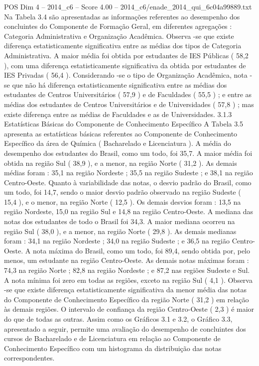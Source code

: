 \begin{textsample}{POS Dim 4 – 2014\_c6 – Score 4.00 – 2014\_c6/enade\_2014\_qui\_6c04a99889.txt}
Na Tabela 3.4 são apresentadas as informações referentes ao desempenho dos concluintes do Componente de Formação Geral, em diferentes agregações : Categoria Administrativa e Organização Acadêmica.
Observa -se que existe diferença estatisticamente significativa entre as médias dos tipos de Categoria Administrativa.
A maior média foi obtida por estudantes de IES Públicas ( 58,2 ), com uma diferença estatisticamente significativa da obtida por estudantes de IES Privadas ( 56,4 ).
Considerando -se o tipo de Organização Acadêmica, nota -se que não há diferença estatisticamente significativa entre as médias dos estudantes de Centros Universitários ( 57,9 ) e de Faculdades ( 55,5 ) ; e entre as médias dos estudantes de Centros Universitários e de Universidades ( 57,8 ) ; mas existe diferença entre as médias de Faculdades e as de Universidades. 3.1.3 Estatísticas Básicas do Componente de Conhecimento Específico A Tabela 3.5 apresenta as estatísticas básicas referentes ao Componente de Conhecimento Específico da área de Química ( Bacharelado e Licenciatura ).
A média do desempenho dos estudantes do Brasil, como um todo, foi 35,7.
A maior média foi obtida na região Sul ( 38,9 ), e a menor, na região Norte ( 31,2 ).
As demais médias foram : 35,1 na região Nordeste ; 35,5 na região Sudeste ; e 38,1 na região Centro-Oeste.
Quanto à variabilidade das notas, o desvio padrão do Brasil, como um todo, foi 14,7, sendo o maior desvio padrão observado na região Sudeste ( 15,4 ), e o menor, na região Norte ( 12,5 ).
Os demais desvios foram : 13,5 na região Nordeste, 15,0 na região Sul e 14,8 na região Centro-Oeste.
A mediana das notas dos estudantes de todo o Brasil foi 34,3.
A maior mediana ocorreu na região Sul ( 38,0 ), e a menor, na região Norte ( 29,8 ).
As demais medianas foram : 34,1 na região Nordeste ; 34,0 na região Sudeste ; e 36,5 na região Centro-Oeste.
A nota máxima do Brasil, como um todo, foi 89,4, sendo obtida por, pelo menos, um estudante na região Centro-Oeste.
As demais notas máximas foram : 74,3 na região Norte ; 82,8 na região Nordeste ; e 87,2 nas regiões Sudeste e Sul.
A nota mínima foi zero em todas as regiões, exceto na região Sul ( 4,1 ).
Observa -se que existe diferença estatisticamente significativa da menor média das notas do Componente de Conhecimento Específico da região Norte ( 31,2 ) em relação às demais regiões.
O intervalo de confiança da região Centro-Oeste ( 2,3 ) é maior do que de todas as outras.
Assim como os Gráficos 3.1 e 3.2, o Gráfico 3.3, apresentado a seguir, permite uma avaliação do desempenho de concluintes dos cursos de Bacharelado e de Licenciatura em relação ao Componente de Conhecimento Específico com um histograma da distribuição das notas correspondentes.

\end{textsample}
